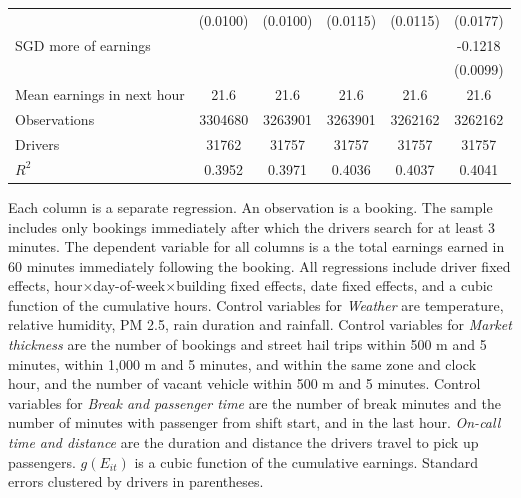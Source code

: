 \documentclass[reviewmode,AEJ]{AEA}
\begin{document}
\begin{table}[]
{\begin{tabularx}{\textwidth}{l@{\extracolsep{\fill}}*{5}{S[table-format = 0.4, table-space-text-pre={**}, table-space-text-post={-**}]}}
                &    (0.0100)         &    (0.0100)         &    (0.0115)         &    (0.0115)         &    (0.0177)         \\
     SGD more of earnings&                     &                     &                     &                     &     -0.1218\sym{***}         \\
                &                     &                     &                     &                     &    (0.0099)         \\
    \midrule
    Mean earnings in next hour&     \num{21.6}         &     \num{21.6}         &     \num{21.6}         &     \num{21.6}         &     \num{21.6}         \\
    Observations&\num{3304680}         &\num{3263901}         &\num{3263901}         &\num{3262162}         &\num{3262162}         \\
    Drivers     & \num{31762}         & \num{31757}         & \num{31757}         & \num{31757}         & \num{31757}         \\
    \(R^2\)     &      0.3952         &      0.3971         &      0.4036         &      0.4037         &      0.4041         \\
    \bottomrule
    \end{tabularx}
    }
	\begin{tablenotes}
	\small
        Each column is a separate regression. An observation is a booking. The sample includes only bookings immediately after which the drivers search for at least 3 minutes. The dependent variable for all columns is a the total earnings earned in 60 minutes immediately following the booking. All regressions include driver fixed effects, hour\(\times\)day-of-week\(\times\)building fixed effects, date fixed effects, and a cubic function of the cumulative hours. Control variables for \textit{Weather} are temperature, relative humidity, PM 2.5, rain duration and rainfall. Control variables for \textit{Market thickness} are the number of bookings and street hail trips within 500 m and 5 minutes, within 1,000 m and 5 minutes, and within the same zone and clock hour, and the number of vacant vehicle within 500 m and 5 minutes. Control variables for \textit{Break and passenger time} are the number of break minutes and the number of minutes with passenger from shift start, and in the last hour. \textit{On-call time and distance} are the duration and distance the drivers travel to pick up passengers. \(g(E_{it})\) is a cubic function of the cumulative earnings. Standard errors clustered by drivers in parentheses.%
	\end{tablenotes}
\end{table}
\end{document}
